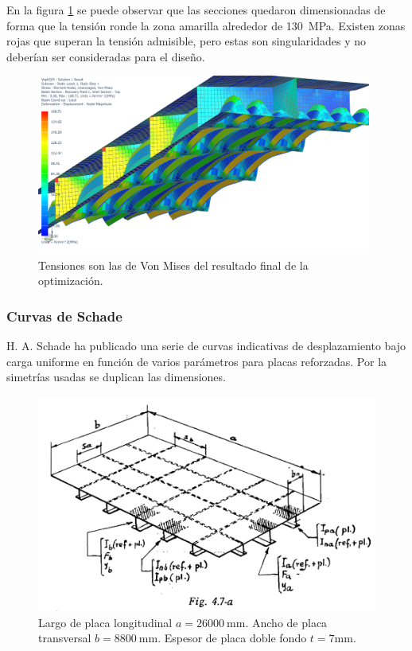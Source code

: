 \documentclass[onecolumn,10pt,titlepage]{article}
\begin{document}
En la figura \ref{fig:optimizacion} se puede observar que las secciones quedaron dimensionadas de forma que la tensión ronde la zona amarilla alrededor de \SI{130}{\mega\pascal}. Existen zonas rojas que superan la tensión admisible, pero estas son singularidades y no deberían ser consideradas para el diseño.

 \begin{figure}
     \centering
     \includegraphics[draft,width=11cm]{fig/VoptiSIM.png}
     \caption{Tensiones son las de Von Mises del resultado final de la optimización.}
     \label{fig:optimizacion}
 \end{figure}

\subsubsection*{Curvas de Schade}
H. A. Schade ha publicado una serie de curvas indicativas de desplazamiento bajo carga uniforme en función de varios parámetros para placas reforzadas. Por la simetrías usadas se duplican las dimensiones.
\begin{figure}[htb!]
	\centering
	\includegraphics[draft,width=.7\textwidth]{fig/placaschade.png}
	\caption{Largo de placa longitudinal $a=\SI{26000}{\milli \meter}$. Ancho de placa transversal $b=\SI{8800}{\milli\meter}$. Espesor de placa doble fondo $t=7\si{\milli \meter}$.}
	\label{fig:placaschade}
\end{figure}
\end{document}
